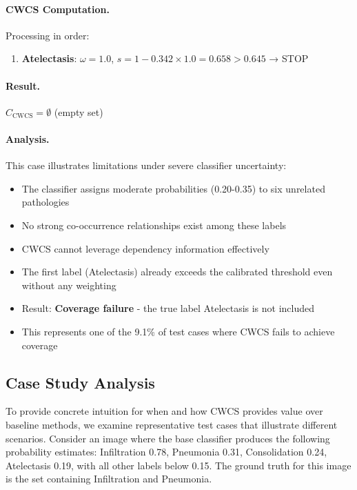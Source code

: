 \paragraph{CWCS Computation.} Processing in order:

\begin{enumerate}
    \item \textbf{Atelectasis}: $\omega = 1.0$, $s = 1 - 0.342 \times 1.0 = 0.658 > 0.645$ → STOP
\end{enumerate}

\paragraph{Result.} $C_{\text{CWCS}} = \emptyset$ (empty set)

\paragraph{Analysis.} This case illustrates limitations under severe classifier uncertainty:
\begin{itemize}
    \item The classifier assigns moderate probabilities (0.20-0.35) to six unrelated pathologies
    \item No strong co-occurrence relationships exist among these labels
    \item CWCS cannot leverage dependency information effectively
    \item The first label (Atelectasis) already exceeds the calibrated threshold even without any weighting
    \item Result: \textbf{Coverage failure} - the true label Atelectasis is not included
    \item This represents one of the 9.1\% of test cases where CWCS fails to achieve coverage
\end{itemize}

\subsection{Case Study Analysis}
\label{subsec:case-study-analysis}

To provide concrete intuition for when and how CWCS provides value over baseline methods, we examine representative test cases that illustrate different scenarios.
Consider an image where the base classifier produces the following probability estimates: Infiltration 0.78, Pneumonia 0.31, Consolidation 0.24, Atelectasis 0.19, with all other labels below 0.15.
The ground truth for this image is the set containing Infiltration and Pneumonia.

